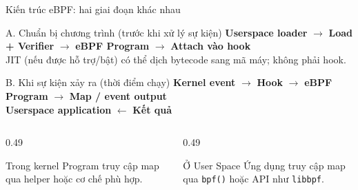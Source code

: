 \begin{frame}{Kiến trúc eBPF: hai giai đoạn khác nhau}
  \begin{block}{A. Chuẩn bị chương trình (trước khi xử lý sự kiện)}
    \centering
    \textbf{Userspace loader} $\longrightarrow$ \textbf{Load + Verifier}
    $\longrightarrow$ \textbf{eBPF Program} $\longrightarrow$ \textbf{Attach vào hook}
    \\[0.1cm]
    \footnotesize{JIT (nếu được hỗ trợ/bật) có thể dịch bytecode sang mã máy; không phải hook.}
  \end{block}
  \vspace{0.15cm}
  \begin{block}{B. Khi sự kiện xảy ra (thời điểm chạy)}
    \centering
    \textbf{Kernel event} $\longrightarrow$ \textbf{Hook}
    $\longrightarrow$ \textbf{eBPF Program} $\longrightarrow$ \textbf{Map / event output}
    \\[0.1cm]
    \textbf{Userspace application} $\longleftarrow$ \textbf{Kết quả}
  \end{block}
  \vspace{0.13cm}
  \begin{columns}[T,onlytextwidth]
    \begin{column}{0.49\textwidth}
      \begin{block}{Trong kernel}
        Program truy cập map qua helper hoặc cơ chế phù hợp.
      \end{block}
    \end{column}
    \begin{column}{0.49\textwidth}
      \begin{block}{Ở User Space}
        Ứng dụng truy cập map qua \texttt{bpf()} hoặc API như \texttt{libbpf}.
      \end{block}
    \end{column}
  \end{columns}
\end{frame}

